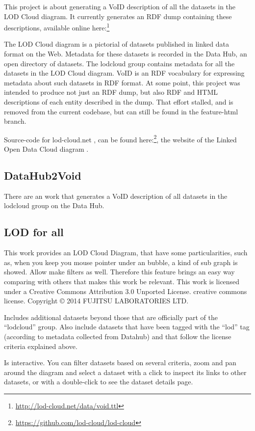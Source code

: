 \documentclass{iosart2c}
\begin{document}
This project is about generating a VoID description of all the datasets in the LOD Cloud diagram. It currently generates an RDF dump containing these descriptions, available online here:\footnote{\url{http://lod-cloud.net/data/void.ttl}}

The LOD Cloud diagram is a pictorial of datasets published in linked data format on the Web.
Metadata for these datasets is recorded in the Data Hub, an open directory of datasets. The lodcloud group contains metadata for all the datasets in the LOD Cloud diagram.
VoID is an RDF vocabulary for expressing metadata about such datasets in RDF format.
At some point, this project was intended to produce not just an RDF dump, but also RDF and HTML descriptions of each entity described in the dump. That effort stalled, and is removed from the current codebase, but can still be found in the feature-html branch.

Source-code for lod-cloud.net \cite{lodcloud}, can be found here:\footnote{ \url{https://github.com/lod-cloud/lod-cloud}}, the website of the Linked Open Data Cloud diagram \cite{lodcloud}.

\subsection{DataHub2Void}
There are an work \cite{Datahub2Void} that generates a VoID description of all datasets in the lodcloud group on the Data Hub.

\subsection{LOD for all}
This work \cite{lod4all} provides an LOD Cloud Diagram, that have some particularities, such as, when you keep you mouse pointer under an bubble, a kind of sub graph is showed. Allow make filters as well. Therefore this feature brings an easy way comparing with others that makes this work be relevant.
This work is licensed under a Creative Commons Attribution 3.0 Unported License. creative commons license. Copyright © 2014 FUJITSU LABORATORIES LTD.

Includes additional datasets beyond those that are officially part of the “lodcloud” group. Also include datasets that have been tagged with the “lod” tag (according to metadata collected from Datahub) and that follow the license criteria explained above.

Is interactive. You can filter datasets based on several criteria, zoom and pan around the diagram and select a dataset with a click to inspect its links to other datasets, or with a double-click to see the dataset details page.
\end{document}

